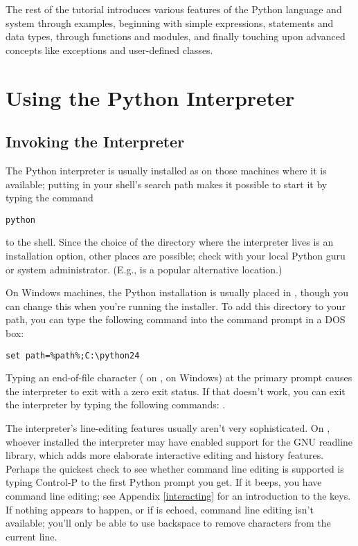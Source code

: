 \documentclass{manual}
\begin{document}
The rest of the tutorial introduces various features of the Python
language and system through examples, beginning with simple
expressions, statements and data types, through functions and modules,
and finally touching upon advanced concepts like exceptions
and user-defined classes.

\chapter{Using the Python Interpreter \label{using}}

\section{Invoking the Interpreter \label{invoking}}

The Python interpreter is usually installed as
 on those machines where it is available;
putting  in your \UNIX{} shell's search path
makes it possible to start it by typing the command

\begin{verbatim}
python
\end{verbatim}

to the shell.  Since the choice of the directory where the interpreter
lives is an installation option, other places are possible; check with
your local Python guru or system administrator.  (E.g.,
 is a popular alternative location.)

On Windows machines, the Python installation is usually placed in
, though you can change this when you're running
the installer.  To add this directory to your path, 
you can type the following command into the command prompt in a DOS box:

\begin{verbatim}
set path=%path%;C:\python24
\end{verbatim}


Typing an end-of-file character ( on \UNIX,
 on Windows) at the primary prompt causes the
interpreter to exit with a zero exit status.  If that doesn't work,
you can exit the interpreter by typing the following commands:
.

The interpreter's line-editing features usually aren't very
sophisticated.  On \UNIX, whoever installed the interpreter may have
enabled support for the GNU readline library, which adds more
elaborate interactive editing and history features. Perhaps the
quickest check to see whether command line editing is supported is
typing Control-P to the first Python prompt you get.  If it beeps, you
have command line editing; see Appendix \ref{interacting} for an
introduction to the keys.  If nothing appears to happen, or if
 is echoed, command line editing isn't available; you'll
only be able to use backspace to remove characters from the current
line.
\end{document}

